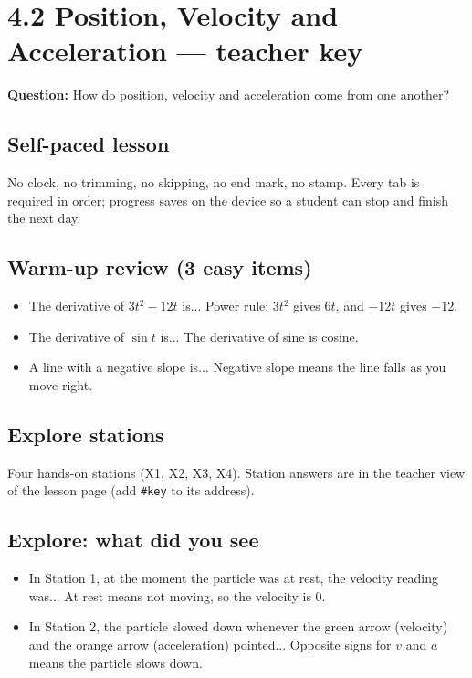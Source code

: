 \documentclass[11pt]{article}
\begin{document}
\section*{4.2 Position, Velocity and Acceleration --- teacher key}
\textbf{Question:} How do position, velocity and acceleration come from one another?\par
\subsection*{Self-paced lesson}No clock, no trimming, no skipping, no end mark, no stamp. Every tab is required in order; progress saves on the device so a student can stop and finish the next day.\par
\subsection*{Warm-up review (3 easy items)}\begin{itemize}
\item The derivative of $3t^2-12t$ is...  Power rule: $3t^2$ gives $6t$, and $-12t$ gives $-12$.
\item The derivative of $\sin t$ is...  The derivative of sine is cosine.
\item A line with a negative slope is...  Negative slope means the line falls as you move right.
\end{itemize}
\subsection*{Explore stations}Four hands-on stations (X1, X2, X3, X4). Station answers are in the teacher view of the lesson page (add \texttt{\#key} to its address).\par
\subsection*{Explore: what did you see}\begin{itemize}
\item In Station 1, at the moment the particle was at rest, the velocity reading was...  At rest means not moving, so the velocity is 0.
\item In Station 2, the particle slowed down whenever the green arrow (velocity) and the orange arrow (acceleration) pointed...  Opposite signs for $v$ and $a$ means the particle slows down.
\end{itemize}
\end{document}
